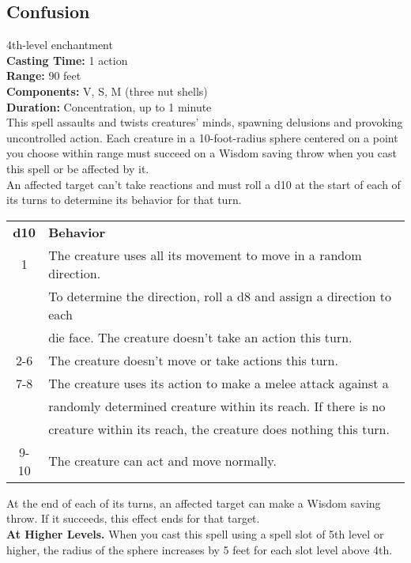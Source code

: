 \documentclass[11pt, A4paper, english]{article}
\begin{document}
		\subsection{Confusion}
4th-level enchantment \\
\textbf{Casting Time:} 1 action \\
\textbf{Range:} 90 feet \\
\textbf{Components:} V, S, M (three nut shells) \\
\textbf{Duration:} Concentration, up to 1 minute \\
This spell assaults and twists creatures' minds, spawning delusions and provoking uncontrolled action. Each creature in a 10-foot-radius sphere centered on a point you choose within range must succeed on a Wisdom saving throw when you cast this spell or be affected by it. \\
An affected target can’t take reactions and must roll a d10 at the start of each of its turns to determine its behavior for that turn. \\
			\begin{tabular}{cl}
\textbf{d10} & \textbf{Behavior} \\
1    & The creature uses all its movement to move in a random direction. \\
     & To determine the direction, roll a d8 and assign a direction to each \\
     & die face. The creature doesn’t take an action this turn. \\
2-6  & The creature doesn’t move or take actions this turn. \\
7-8  & The creature uses its action to make a melee attack against a \\
     & randomly determined creature within its reach. If there is no \\
     & creature within its reach, the creature does nothing this turn. \\
9-10 & The creature can act and move normally.
			\end{tabular}
At the end of each of its turns, an affected target can make a Wisdom saving throw. If it succeeds, this effect ends for that target. \\
\textbf{At Higher Levels.} When you cast this spell using a spell slot of 5th level or higher, the radius of the sphere increases by 5 feet for each slot level above 4th.
\end{document}
